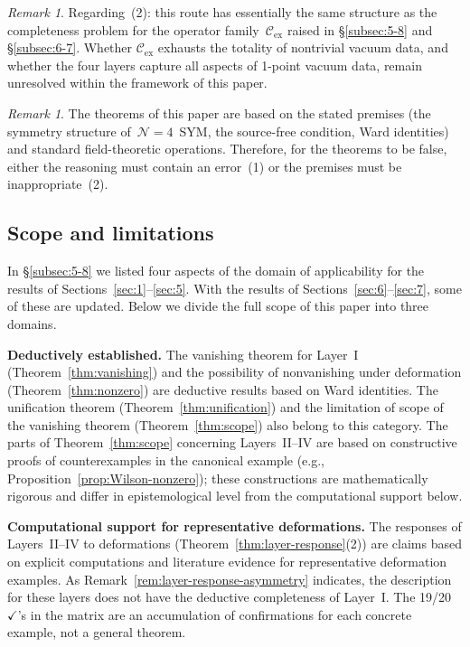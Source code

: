 \documentclass[
  aps,
  prd,
  preprint,
  groupedaddress,
  nofootinbib,
  longbibliography
]{revtex4-2}
\theoremstyle{remark}
\newtheorem{remark}[definition]{Remark}
\newcommand{\Cex}{\mathcal{C}_{\mathrm{ex}}}
\newcommand{\N}{\mathcal{N}}
\begin{document}
\begin{remark}\label{rem:falsification-2}
Regarding~(2): this route has essentially the same structure as
the completeness problem for the operator family~$\Cex$ raised
in \S\ref{subsec:5-8} and \S\ref{subsec:6-7}.
Whether $\Cex$ exhausts the totality of nontrivial vacuum data,
and whether the four layers capture all aspects of 1-point vacuum
data, remain unresolved within the framework of this paper.
\end{remark}

\begin{remark}\label{rem:falsification-logic}
The theorems of this paper are based on the stated premises
(the symmetry structure of~$\N=4$~SYM, the source-free condition,
Ward identities) and standard field-theoretic operations.
Therefore, for the theorems to be false, either the reasoning
must contain an error~(1) or the premises must be
inappropriate~(2).
\end{remark}

\subsection{Scope and limitations}\label{subsec:8-4}

In \S\ref{subsec:5-8} we listed four aspects of the domain
of applicability for the results of
Sections~\ref{sec:1}--\ref{sec:5}.
With the results of Sections~\ref{sec:6}--\ref{sec:7},
some of these are updated.
Below we divide the full scope of this paper into three domains.

\textbf{Deductively established.}
The vanishing theorem for Layer~I
(Theorem~\ref{thm:vanishing}) and the possibility of
nonvanishing under deformation (Theorem~\ref{thm:nonzero}) are
deductive results based on Ward identities.
The unification theorem (Theorem~\ref{thm:unification}) and
the limitation of scope of the vanishing theorem
(Theorem~\ref{thm:scope}) also belong to this category.
The parts of Theorem~\ref{thm:scope} concerning
Layers~II--IV are based on constructive proofs of
counterexamples in the canonical example
(e.g., Proposition~\ref{prop:Wilson-nonzero}); these
constructions are mathematically rigorous and differ in
epistemological level from the computational support below.

\textbf{Computational support for representative deformations.}
The responses of Layers~II--IV to deformations
(Theorem~\ref{thm:layer-response}(2)) are claims based on
explicit computations and literature evidence for representative
deformation examples.
As Remark~\ref{rem:layer-response-asymmetry} indicates, the
description for these layers does not have the deductive
completeness of Layer~I\@.
The 19/20 $\checkmark$'s in the matrix are an accumulation of
confirmations for each concrete example, not a general theorem.
\end{document}
